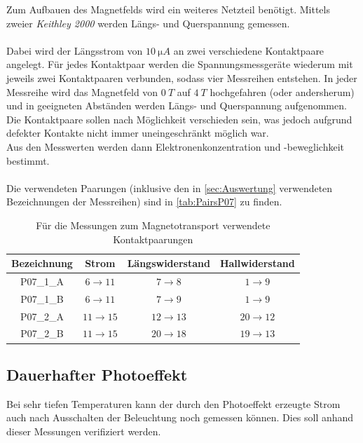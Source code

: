 Zum Aufbauen des Magnetfelds wird ein weiteres Netzteil benötigt.
Mittels zweier \emph{Keithley 2000} werden Längs- und Querspannung gemessen.\\\\
Dabei wird der Längsstrom von $10\ \si{\micro A}$ an zwei verschiedene Kontaktpaare angelegt.
Für jedes Kontaktpaar werden die Spannungsmessgeräte wiederum mit jeweils zwei Kontaktpaaren verbunden, sodass vier Messreihen entstehen.
In jeder Messreihe wird das Magnetfeld von $0\ \si{T}$ auf $4\ \si{T}$ hochgefahren (oder andersherum) und in geeigneten Abständen werden Längs- und Querspannung aufgenommen.
Die Kontaktpaare sollen nach Möglichkeit verschieden sein, was jedoch aufgrund defekter Kontakte nicht immer uneingeschränkt möglich war.\\
Aus den Messwerten werden dann Elektronenkonzentration und -beweglichkeit bestimmt.\\\\
Die verwendeten Paarungen (inklusive den in \autoref{sec:Auswertung} verwendeten Bezeichnungen der Messreihen) sind in \autoref{tab:PairsP07} zu finden.\\

\begin{table}[ht]
\caption{Für die Messungen zum Magnetotransport verwendete Kontaktpaarungen}
\label{tab:PairsP07}
\centering
\begin{tabular}{cccc}
\toprule
Bezeichnung & Strom & Längswiderstand & Hallwiderstand\\
\midrule
P07\_1\_A & $6\rightarrow 11$ & $7\rightarrow 8$ & $1\rightarrow 9$\\
P07\_1\_B & $6\rightarrow 11$ & $7\rightarrow 9$ & $1\rightarrow 9$\\
P07\_2\_A & $11\rightarrow 15$ & $12\rightarrow 13$ & $20\rightarrow 12$\\
P07\_2\_B & $11\rightarrow 15$ & $20\rightarrow 18$ & $19\rightarrow 13$\\
\bottomrule
\end{tabular}
\end{table}

\subsection{Dauerhafter Photoeffekt}\label{sec:Photoeffekt}
Bei sehr tiefen Temperaturen kann der durch den Photoeffekt erzeugte Strom auch nach Ausschalten der Beleuchtung noch gemessen können.
Dies soll anhand dieser Messungen verifiziert werden.

